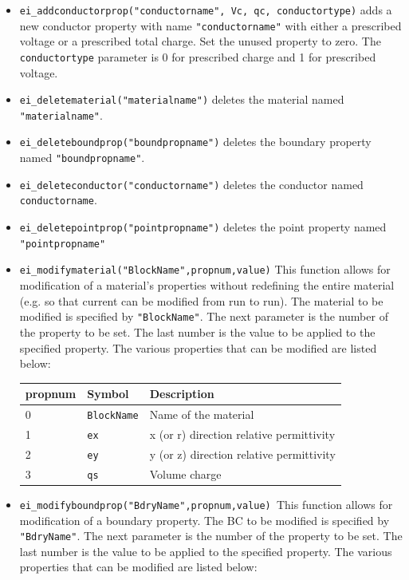 \begin{itemize}
For a ``Periodic'' boundary condition, set \texttt{BdryFormat} to 3
and set all other parameters to zero.

For an ``Anti-Perodic'' boundary condition, set \texttt{BdryFormat}
to 4 set all other parameters to zero.

\item \texttt{ei\_addconductorprop("conductorname", Vc, qc, conductortype)} adds a new
conductor property with name \texttt{"conductorname"} with either a
prescribed voltage or a prescribed total charge. Set the unused
property to zero. The \texttt{conductortype} parameter is 0 for
prescribed charge and 1 for prescribed voltage.

\item \texttt{ei\_deletematerial("materialname")} deletes the material named
\texttt{"materialname"}.

\item \texttt{ei\_deleteboundprop("boundpropname")} deletes the boundary property
named \texttt{"boundpropname"}.

\item \texttt{ei\_deleteconductor("conductorname")} deletes the conductor named
\texttt{conductorname}.

\item \texttt{ei\_deletepointprop("pointpropname")} deletes the point property named
\texttt{"pointpropname"}

\item \texttt{ei\_modifymaterial("BlockName",propnum,value)} This function allows for
modification of a material's properties without redefining the
entire material (e.g. so that current can be modified from run to
run). The material to be modified is specified by
\texttt{"BlockName"}. The next parameter is the number of the
property to be set. The last number is the value to be applied to
the specified property. The various properties that can be modified
are listed below:

\begin{tabular}{lll}
propnum & Symbol &  Description \\ \hline
 0 & \texttt{BlockName} & Name of the material \\
 1 & \texttt{ex} & x (or r) direction relative permittivity \\
 2 & \texttt{ey} & y (or z) direction relative permittivity \\
 3 & \texttt{qs} & Volume charge
\end{tabular}


\item \texttt{ei\_modifyboundprop("BdryName",propnum,value) }This function allows for
modification of a boundary property. The BC to be modified is specified by
\texttt{"BdryName"}. The next parameter is the number of the property to be
set. The last number is the value to be applied to the specified property.
The various properties that can be modified are listed below:


\end{itemize}

